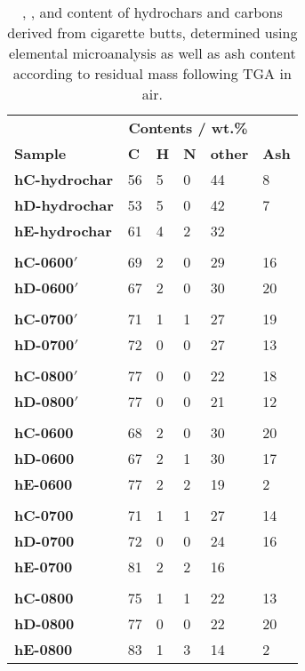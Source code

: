 \begin{table}[t!]
    \caption{, , and  content of hydrochars and carbons derived from cigarette butts, determined using elemental microanalysis as well as ash content according to residual mass following TGA in air.}
    \label{tb:chn_ash}
    \begin{tabularx}{\textwidth}{lXXXX|X}
    \toprule
        & \multicolumn{4}{c}{\textbf{Contents / wt.\%}} \\
        \textbf{Sample} & \textbf{C} & \textbf{H} & \textbf{N} & \textbf{other} & \textbf{Ash} \\
    \midrule
        \textbf{hC-hydrochar} & 56 & 5 & 0 & 44 & 8 \\
        \textbf{hD-hydrochar} & 53 & 5 & 0 & 42 & 7 \\
        \textbf{hE-hydrochar} & 61 & 4 & 2 & 32 & \\
        &&&&&\\
        \textbf{hC-0600$'$} & 69 & 2 & 0 & 29 & 16 \\
        \textbf{hD-0600$'$} & 67 & 2 & 0 & 30 & 20 \\
        &&&&&\\
        \textbf{hC-0700$'$} & 71 & 1 & 1 & 27 & 19 \\
        \textbf{hD-0700$'$} & 72 & 0 & 0 & 27 & 13\\
        &&&&&\\
        \textbf{hC-0800$'$} & 77 & 0 & 0 & 22 & 18 \\
        \textbf{hD-0800$'$} & 77 & 0 & 0 & 21 & 12 \\
        &&&&&\\
        \textbf{hC-0600} & 68 & 2 & 0 & 30 & 20 \\
        \textbf{hD-0600} & 67 & 2 & 1 & 30 & 17 \\
        \textbf{hE-0600} & 77 & 2 & 2 & 19 & 2 \\
        &&&&&\\
        \textbf{hC-0700} & 71 & 1 & 1 & 27 & 14 \\
        \textbf{hD-0700} & 72 & 0 & 0 & 24 & 16 \\
        \textbf{hE-0700} & 81 & 2 & 2 & 16 & \\
        &&&&&\\
        \textbf{hC-0800} & 75 & 1 & 1 & 22 & 13 \\
        \textbf{hD-0800} & 77 & 0 & 0 & 22 & 20 \\
        \textbf{hE-0800} & 83 & 1 & 3 & 14 & 2 \\

\end{tabularx}
\end{table}
